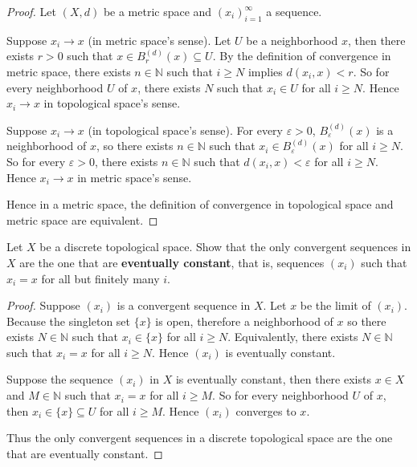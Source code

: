 \begin{proof}
	Let $(X, d)$ be a metric space and ${(x_{i})}^{\infty}_{i=1}$ a sequence.

	Suppose $x_{i}\to x$ (in metric space's sense). Let $U$ be a neighborhood $x$, then there exists $r > 0$ such that $x\in B^{(d)}_{r}(x)\subseteq U$. By the definition of convergence in metric space, there exists $n\in\mathbb{N}$ such that $i\geq N$ implies $d(x_{i}, x) < r$. So for every neighborhood $U$ of $x$, there exists $N$ such that $x_{i}\in U$ for all $i\geq N$. Hence $x_{i}\to x$ in topological space's sense.

	Suppose $x_{i}\to x$ (in topological space's sense). For every $\varepsilon > 0$, $B^{(d)}_{\varepsilon}(x)$ is a neighborhood of $x$, so there exists $n\in\mathbb{N}$ such that $x_{i}\in B^{(d)}_{\varepsilon}(x)$ for all $i\geq N$. So for every $\varepsilon > 0$, there exists $n\in\mathbb{N}$ such that $d(x_{i}, x) < \varepsilon$ for all $i\geq N$. Hence $x_{i}\to x$ in metric space's sense.

	Hence in a metric space, the definition of convergence in topological space and metric space are equivalent.
\end{proof}

\begin{exercise}{2.13}
	Let $X$ be a discrete topological space. Show that the only convergent sequences in $X$ are the one that are \textbf{eventually constant}, that is, sequences $(x_{i})$ such that $x_{i} = x$ for all but finitely many $i$.
\end{exercise}

\begin{proof}
	Suppose ${(x_{i})}$ is a convergent sequence in $X$. Let $x$ be the limit of ${(x_{i})}$. Because the singleton set $\{ x \}$ is open, therefore a neighborhood of $x$ so there exists $N\in\mathbb{N}$ such that $x_{i}\in \{ x \}$ for all $i\geq N$. Equivalently, there exists $N\in\mathbb{N}$ such that $x_{i} = x$ for all $i\geq N$. Hence ${(x_{i})}$ is eventually constant.

	Suppose the sequence ${(x_{i})}$ in $X$ is eventually constant, then there exists $x\in X$ and $M\in\mathbb{N}$ such that $x_{i} = x$ for all $i\geq M$. So for every neighborhood $U$ of $x$, then $x_{i}\in \{ x \}\subseteq U$ for all $i\geq M$. Hence ${(x_{i})}$ converges to $x$.

	Thus the only convergent sequences in a discrete topological space are the one that are eventually constant.
\end{proof}

